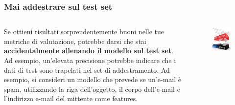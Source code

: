 \begin{frame}

	\frametitle{Mai addestrare sul test set}

	\begin{columns}
			Se ottieni risultati sorprendentemente buoni nelle tue metriche di valutazione, potrebbe darsi che stai \textbf{accidentalmente allenando il modello sul test set}.
			\newlinedouble
			Ad esempio, un'elevata precisione potrebbe indicare che i dati di test sono trapelati nel set di addestramento.
			\newlinedouble
			Ad esempio, si consideri un modello che prevede se un'e-mail è spam, utilizzando la riga dell'oggetto, il corpo dell'e-mail e l'indirizzo e-mail del mittente come features.

			\begin{figure}[!htbp]
				\centering
				\includegraphics[width=1.0\linewidth]{images/supervised/validation_test_splitting_data/spam_filter.jpg}
			\end{figure}

	\end{columns}

\end{frame}


